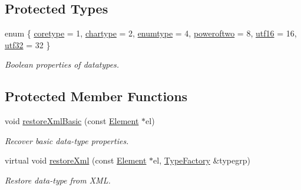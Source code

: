 \subsection*{Protected Types}
\begin{DoxyCompactItemize}
\item 
enum \{ \newline
\mbox{\hyperlink{class_datatype_abf6a43616e36ab43140d425fb8df3994a8efcece19aae42262429fbf59330a2c7}{coretype}} = 1, 
\mbox{\hyperlink{class_datatype_abf6a43616e36ab43140d425fb8df3994a291f711994553cf2ed3b2188536cf862}{chartype}} = 2, 
\mbox{\hyperlink{class_datatype_abf6a43616e36ab43140d425fb8df3994ac49f33c823aed43744eb7b5ab70d48cb}{enumtype}} = 4, 
\mbox{\hyperlink{class_datatype_abf6a43616e36ab43140d425fb8df3994aab21c62169d90a130a09bd0df16a82b9}{poweroftwo}} = 8, 
\newline
\mbox{\hyperlink{class_datatype_abf6a43616e36ab43140d425fb8df3994a5e1e1035b8236663c0fae4a61ec72512}{utf16}} = 16, 
\mbox{\hyperlink{class_datatype_abf6a43616e36ab43140d425fb8df3994ad201af95657b98f2835a7a3bf12c7d4c}{utf32}} = 32
 \}
\begin{DoxyCompactList}\small\item\em Boolean properties of datatypes. \end{DoxyCompactList}\end{DoxyCompactItemize}
\subsection*{Protected Member Functions}
\begin{DoxyCompactItemize}
\item 
void \mbox{\hyperlink{class_datatype_afeb70488c52d024b293d5198c98b3f49}{restore\+Xml\+Basic}} (const \mbox{\hyperlink{class_element}{Element}} $\ast$el)
\begin{DoxyCompactList}\small\item\em Recover basic data-\/type properties. \end{DoxyCompactList}\item 
virtual void \mbox{\hyperlink{class_datatype_aed882ae693a31a64d56fffb9abdaa575}{restore\+Xml}} (const \mbox{\hyperlink{class_element}{Element}} $\ast$el, \mbox{\hyperlink{class_type_factory}{Type\+Factory}} \&typegrp)
\begin{DoxyCompactList}\small\item\em Restore data-\/type from X\+ML. \end{DoxyCompactList}\end{DoxyCompactItemize}
